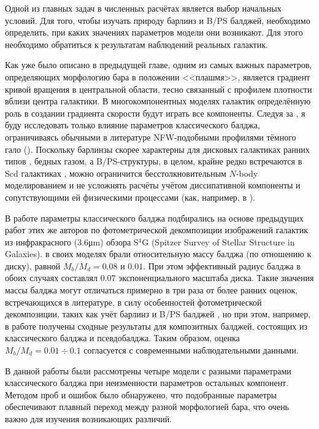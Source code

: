 \documentclass{trlnotes}
\begin{document}
\setcounter{footnote}{0}
Одной из главных задач в численных расчётах является выбор начальных условий. Для того, чтобы изучать природу барлинз и B/PS балджей, необходимо определить, при каких значениях параметров модели они возникают. Для этого необходимо обратиться к результатам наблюдений реальных галактик.

Как уже было описано в предыдущей главе, одним из самых важных параметров, определяющих морфологию бара в положении <<плашмя>>,
является градиент кривой вращения в центральной области, тесно связанный с профилем плотности вблизи центра галактики. В многокомпонентных моделях галактик определённую роль в создании градиента скорости будут играть все компоненты. Следуя за \citet{salo2017}, я буду исследовать только влияние параметров классического балджа, ограничиваясь обычными в литературе NFW-подобными профилями тёмного гало (\cite{navarro1996}). Поскольку барлинзы скорее характерны для дисковых галактиках ранних типов \citep{laurikainen2011}, бедных газом, а B/PS-структуры, в целом, крайне редко встречаются в Scd галактиках \citep{erwin2017, li2017a}, можно ограничится бесстолкновительным $N$-body моделированием и не усложнять расчёты учётом 
диссипативной компоненты и сопутствующими ей физическими процессами (как, например, в \cite{athanassoula2015}). 

В работе \citet{salo2017} параметры классического балджа подбирались на основе предыдущих работ этих же авторов по 
фотометрической декомпозиции изображений галактик из инфракрасного (3.6\thinspace μm) обзора S${}^4$G (Spitzer Survey of 
Stellar Structure in Galaxies). \citet{salo2015} в своих моделях брали относительную массу балджа (по отношению к диску), равной  
$M_b/M_d = 0.08$ и $0.01$. При этом эффективный радиус балджа в обоих случаях составлял $0.07$ экспоненциального 
масштаба диска. Такие значения массы балджа могут отличаться примерно в три раза от более ранних оценок, 
встречающихся в литературе, в силу особенностей фотометрической декомпозиции, таких как учёт барлинз и B/PS 
балджей \citep{laurikainen2016a}, но при этом, например, в работе \citet{erwin2015} получены сходные результаты для 
композитных балджей, состоящих из классического балджа и псевдобалджа. Таким образом, оценка $M_b/M_d = 0.01 \div 
0.1$ согласуется с современными наблюдательными данными.

В данной работы были рассмотрены четыре модели с разными параметрами классического балджа при неизменности параметров остальных компонент.  Методом проб и ошибок было обнаружено, что подобранные параметры обеспечивают плавный переход между разной морфологией бара, что очень важно для изучения возникающих различий. 
\end{document}
